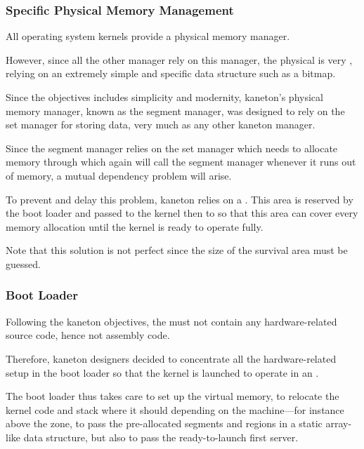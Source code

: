 \begin{frame}
  \frametitle{Specific Physical Memory Management}

  All operating system kernels provide a physical memory manager.

  \-

  However, since all the other manager rely on this manager, the physical
   is  very , relying on an
  extremely simple and specific data structure such as a bitmap.

  \-

  Since the objectives includes simplicity and modernity, kaneton's physical
  memory manager, known as the segment manager, was designed to rely on the
  set manager for storing data, very much as any other kaneton manager.

  \-

  Since the segment manager relies on the set manager which needs to allocate
  memory through  which again will call the segment manager
  whenever it runs out of memory, a mutual dependency problem will arise.

  \-

  To prevent and delay this problem, kaneton relies on a .
  This area is reserved by the boot loader and passed to the kernel then
  to  so that this area can cover every memory allocation
  until the kernel is ready to operate fully.

  \-

  Note that this solution is not perfect since the size of the survival area
  must be guessed.
\end{frame}


\begin{frame}
  \frametitle{Boot Loader}

  Following the kaneton objectives, the  must not contain any
  hardware-related source code, hence not assembly code.

  \-

  Therefore, kaneton designers decided to concentrate all the hardware-related
  setup in the boot loader so that the kernel is launched to operate in
  an .

  \-

  The boot loader thus takes care to set up the virtual memory, to relocate
  the kernel code and stack where it should depending on the machine---for
  instance above the  zone, to pass the
  pre-allocated segments and regions in a static array-like data structure,
  but also to pass the ready-to-launch first server.
\end{frame}

